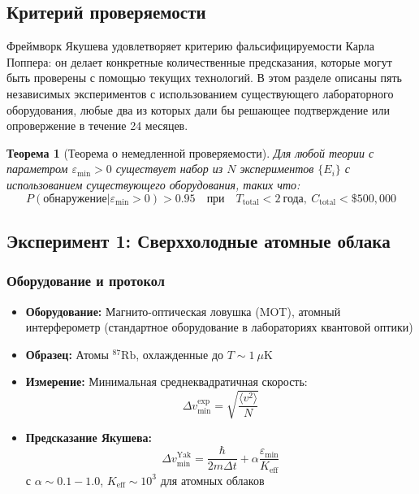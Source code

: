 \documentclass[11pt,a4paper]{article}
\newtheorem{theorem}{Теорема}
\begin{document}
	\subsection{Критерий проверяемости}
	
	Фреймворк Якушева удовлетворяет критерию фальсифицируемости Карла Поппера: он делает конкретные количественные предсказания, которые могут быть проверены с помощью текущих технологий. В этом разделе описаны пять независимых экспериментов с использованием существующего лабораторного оборудования, любые два из которых дали бы решающее подтверждение или опровержение в течение 24 месяцев.
	
	\begin{theorem}[Теорема о немедленной проверяемости]
		Для любой теории с параметром $\varepsilon_{\min} > 0$ существует набор из $N$ экспериментов $\{E_i\}$ с использованием существующего оборудования, таких что:
		\begin{equation}
			\boxed{P(\text{обнаружение}|\varepsilon_{\min} > 0) > 0.95 \quad \text{при} \quad T_{\text{total}} < 2\ \text{года}, \ C_{\text{total}} < \$500,000}
		\end{equation}
	\end{theorem}
	
	\subsection{Эксперимент 1: Сверххолодные атомные облака}
	
	\subsubsection{Оборудование и протокол}
	
	\begin{itemize}
		\item \textbf{Оборудование:} Магнито-оптическая ловушка (MOT), атомный интерферометр (стандартное оборудование в лабораториях квантовой оптики)
		\item \textbf{Образец:} Атомы $^{87}\text{Rb}$, охлажденные до $T \sim 1\ \mu\text{K}$
		\item \textbf{Измерение:} Минимальная среднеквадратичная скорость:
		\[
		\Delta v_{\min}^{\text{exp}} = \sqrt{\frac{\langle v^2 \rangle}{N}}
		\]
		\item \textbf{Предсказание Якушева:}
		\[
		\Delta v_{\min}^{\text{Yak}} = \frac{\hbar}{2m\Delta t} + \alpha \frac{\varepsilon_{\min}}{K_{\mathrm{eff}}}
		\]
		с $\alpha \sim 0.1-1.0$, $K_{\mathrm{eff}} \sim 10^3$ для атомных облаков
	\end{itemize}
	
\end{document}
